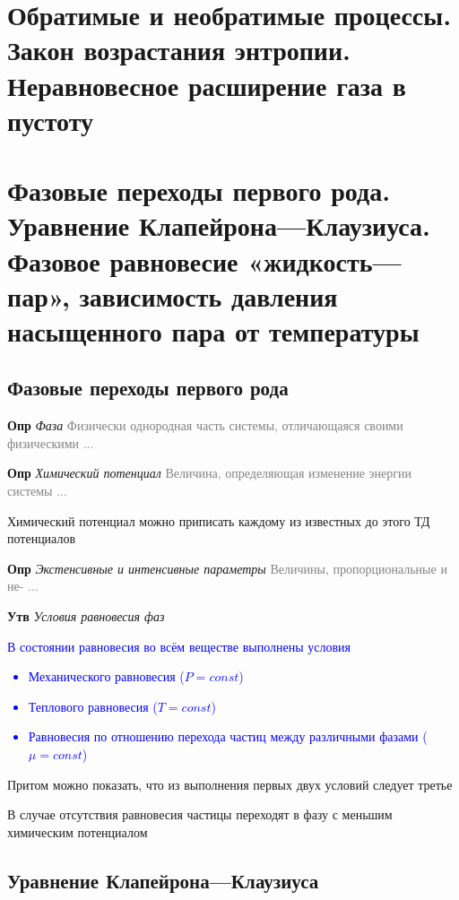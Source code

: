 \documentclass[a4paper, 14pt]{article}
\begin{document}
        \section{Обратимые и необратимые процессы.
    Закон возрастания энтропии.
    Неравновесное расширение газа в пустоту}
    
    \section{Фазовые переходы первого рода.
    Уравнение Клапейрона—Клаузиуса.
    Фазовое равновесие «жидкость—пар», зависимость давления насыщенного пара от температуры}
    
    \subsection{Фазовые переходы первого рода}
    
    \textbf{Опр} \textit{Фаза} \textcolor{gray}{Физически однородная часть системы, отличающаяся своими физическими ...}
    
    \textbf{Опр} \textit{Химический потенциал} \textcolor{gray}{Величина, определяющая изменение энергии системы ...}
    
    Химический потенциал можно приписать каждому из известных до этого ТД потенциалов
    
    \textbf{Опр} \textit{Экстенсивные и интенсивные параметры} \textcolor{gray}{Величины, пропорциональные и не- ...}
    
    \textbf{Утв} \textit{Условия равновесия фаз}
    
    \textcolor{blue}{В состоянии равновесия во всём веществе выполнены условия
        \begin{itemize}
            \item Механического равновесия ($P = const$)
            \item Теплового равновесия ($T = const$)
            \item Равновесия по отношению перехода частиц между различными фазами ($\mu = const$)
        \end{itemize}}
    
    Притом можно показать, что из выполнения первых двух условий следует третье
    
    В случае отсутствия равновесия частицы переходят в фазу с меньшим химическим потенциалом
    
    \subsection{Уравнение Клапейрона—Клаузиуса}
    
\end{document}
